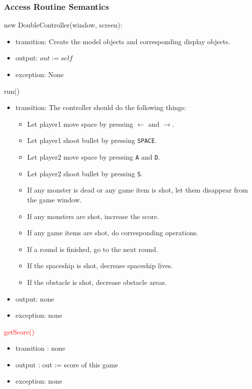 \documentclass[12pt]{article}
\begin{document}
\subsubsection*{Access Routine Semantics}
\noindent new DoubleController(window, screen):
\begin{itemize}
\item transition: Create the model objects and corresponding display objects.
\item output: $out := \mathit{self}$
\item exception: None
\end{itemize}

\noindent run()
\begin{itemize}
\item transition: The controller should do the following things:
\begin{itemize}
\item Let player1 move space by pressing $\leftarrow$ and $\rightarrow$.
\item Let player1 shoot bullet by pressing \verb|SPACE|.
\item Let player2 move space by pressing \verb|A| and \verb|D|.
\item Let player2 shoot bullet by pressing \verb|S|.
\item If any monster is dead or any game item is shot, let them disappear from the game window. 
\item If any monsters are shot, increase the score.
\item If any game items are shot, do corresponding operations. 
\item If a round is finished, go to the next round.
\item If the spaceship is shot, decrease spaceship lives.
\item If the obstacle is shot, decrease obstacle areas.
\end{itemize}
\item output: none
\item exception: none
\end{itemize}



\noindent \textcolor{red}{getScore()}
\begin{itemize}
\item transition : none
\item output : out := score of this game
\item exception: none
\end{itemize}
\end{document}
